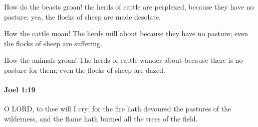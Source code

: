 			\begin{versebox}
					\item[BHS] 
					\item[LXX] 
					\item[ASV] How do the beasts groan! the herds of cattle are perplexed, because they have no pasture; yea, the flocks of sheep are made desolate.
					\item[NIV] How the cattle moan! The herds mill about because they have no pasture; even the flocks of sheep are suffering.
					\item[NRSV] How the animals groan! The herds of cattle wander about because there is no pasture for them; even the flocks of sheep are dazed.
			\end{versebox}

		\paragraph{Joel 1:19} %
			\label{JOEL-1-19}

			O LORD, to thee will I cry: for the fire hath devoured the pastures of the wilderness, and the flame hath burned all the trees of the field.

